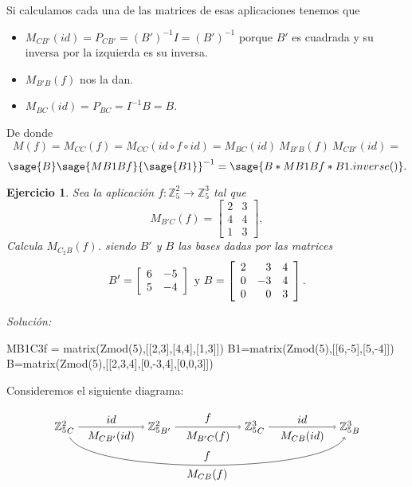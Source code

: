 \documentclass{amsart}
\newtheorem{ejer}{Ejercicio}
\def\z{\mathbb{Z}}
\begin{document}
Si calculamos cada una de las matrices de esas aplicaciones tenemos que
\begin{itemize}
\item $M_{CB'}(id) = P_{CB'} = (B')^{-1}I = (B')^{-1}$ porque $B'$ es cuadrada
y su inversa por la izquierda es su inversa.
\item $M_{B'B}(f)$ nos la dan.
\item $M_{BC}(id) = P_{BC} = I^{-1}B= B$. 
\end{itemize}

De donde 
\[ M(f) = M_{CC}(f) = M_{CC}(id\circ f\circ id) =  M_{BC}(id) \ 
M_{B'B}(f) \ M_{CB'}(id) = \] 
\[ \sage{B}\sage{MB1Bf}{\sage{B1}}^{-1} = \sage{B*MB1Bf*B1.inverse()}. \]



\begin{ejer} 
Sea la aplicación $f: \z _5^2\to \z _5^3$ tal que 
\[ M_{B'C}(f) = \left[ \begin{array}{rr} 2 & 3 \\ 4 & 4\\ 
1 & 3 \end{array} \right], \]  Calcula $M_{C_2B}(f)$. siendo $B'$ y $B$ las bases 
dadas por las matrices 
\[ B' = \left[ \begin{array}{rr} 6 & -5\\ 5 & -4 \end{array} \right] 
\ \hbox{y} \ B = \left[ \begin{array}{rrr} 2 & 3 & 4\\ 0 & -3 & 4\\ 
0 & 0 & 3 \end{array} \right].  \]
\end{ejer}

{\it Soluci\'on:}
\begin{sageblock}
MB1C3f = matrix(Zmod(5),[[2,3],[4,4],[1,3]])
B1=matrix(Zmod(5),[[6,-5],[5,-4]])
B=matrix(Zmod(5),[[2,3,4],[0,-3,4],[0,0,3]])
\end{sageblock}

Consideremos el siguiente diagrama:

$$
\begin{tikzpicture}[xscale = 1.5]
\node (ZCa) at (0,0) {${\z _5^2}_C$};
\node (ZBp) at (2,0) {${\z _5^2}_{B'}$};
\node (ZCb) at (4,0) {${\z _5^3}_C$};
\node (ZB)  at (6,0) {${\z _5^3}_B$};
\draw[->] (ZCa) to node [above] {$id$} 
                   node [below] {$M_{CB'}(id)$} (ZBp);
\draw[->] (ZBp) to node [above] {$f$} 
                   node [below] {$M_{B'C}(f)$} (ZCb); 
\draw[->] (ZCb)  to node [above] {$id$} 
                   node [below] {$M_{CB}(id)$} (ZB);
\draw[->] (ZCa) .. controls (0.5,-1.5) and (5.5,-1.5) .. 
                node [below] {$M_{CB}(f)$} 
                node [above] {$f$} (ZB);
\end{tikzpicture}
$$
\end{document}
